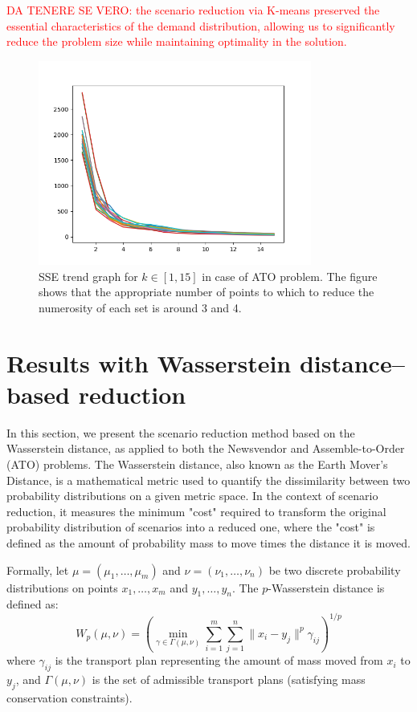 \documentclass[a4paper,12pt]{article}
\begin{document}
	
	
	\textcolor{red}{DA TENERE SE VERO: the scenario reduction via K-means preserved the essential characteristics of the demand distribution, allowing us to significantly reduce the problem size while maintaining optimality in the solution.}	
	
	\newpage
	\begin{figure}[H]
		\centering
		\includegraphics[width=0.8\textwidth]{../immagini/sseATO.png}
		\caption{SSE trend graph for $k \in [1,15]$ in case of ATO problem. The figure shows that the appropriate number of points to which to reduce the numerosity of each set is around 3 and 4.}
		\label{fig:sse-ato}
	\end{figure}
	
	\newpage
	\section{Results with Wasserstein distance--based reduction}
	
	In this section, we present the scenario reduction method based on the Wasserstein distance, as applied to both the Newsvendor and Assemble-to-Order (ATO) problems. The Wasserstein distance, also known as the Earth Mover's Distance, is a mathematical metric used to quantify the dissimilarity between two probability distributions on a given metric space. In the context of scenario reduction, it measures the minimum "cost" required to transform the original probability distribution of scenarios into a reduced one, where the "cost" is defined as the amount of probability mass to move times the distance it is moved.
	
	Formally, let $\mu = (\mu_1, \ldots, \mu_m)$ and $\nu = (\nu_1, \ldots, \nu_n)$ be two discrete probability distributions on points $x_1, \ldots, x_m$ and $y_1, \ldots, y_n$. The $p$-Wasserstein distance is defined as:
	\[
	W_p(\mu, \nu) = \left( \min_{\gamma \in \Gamma(\mu, \nu)} \sum_{i=1}^m \sum_{j=1}^n \|x_i - y_j\|^p \gamma_{ij} \right)^{1/p}
	\]
	where $\gamma_{ij}$ is the transport plan representing the amount of mass moved from $x_i$ to $y_j$, and $\Gamma(\mu, \nu)$ is the set of admissible transport plans (satisfying mass conservation constraints).
	
\end{document}
